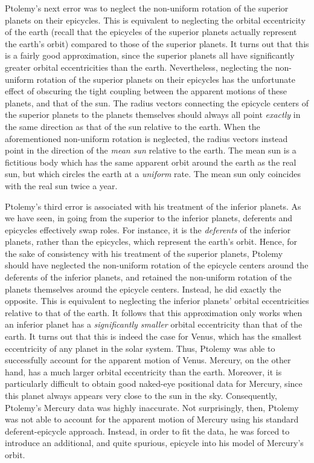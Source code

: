 Ptolemy's next error was to neglect the non-uniform rotation of the
superior planets on their epicycles. This is equivalent to neglecting
the orbital eccentricity of the earth (recall that the epicycles of the superior
planets actually represent the earth's orbit) compared to those of
the superior planets. It turns out that this is a fairly good approximation,
since the superior planets all have significantly greater orbital eccentricities
than the earth. Nevertheless, 
neglecting  the non-uniform rotation of the
superior planets on their epicycles has the unfortunate effect of obscuring the tight coupling between
the apparent motions of these planets, and that of the sun. The radius vectors connecting the epicycle centers of the
superior planets to the planets themselves should always all point {\em exactly}\/ in the
same direction as that of the sun relative to the earth.
When the aforementioned non-uniform rotation is neglected, the radius
vectors instead point in the direction of the {\em mean sun}\/ relative to
the earth. The mean sun is a fictitious body which has the
same apparent orbit around the earth as the real sun, but which circles
the earth at a {\em uniform}\/ rate. The mean sun only coincides with the
real sun twice a year.

Ptolemy's third error is associated with his treatment of the
inferior planets. As we have seen, in going from the superior to the
inferior planets, deferents and epicycles effectively swap roles. 
For instance, it is the {\em deferents}\/ of the inferior planets, rather than the epicycles, which represent
the earth's orbit. Hence, for the sake of consistency with his treatment of
the superior planets, Ptolemy should have neglected the non-uniform
rotation of the epicycle centers around the deferents of the inferior
planets, and retained the non-uniform rotation of the planets themselves around the
epicycle centers. Instead, he did exactly the opposite. This
is equivalent to neglecting the inferior planets' orbital eccentricities relative to
that of the earth. It follows that this approximation only works when an inferior
planet has a {\em significantly smaller}\/ orbital eccentricity than that of the earth.
It turns out that this is indeed the case for Venus, which has the smallest eccentricity
of any planet in the solar system. Thus, Ptolemy was able to
successfully account for the apparent motion of Venus. Mercury, on the
other hand, has a much larger orbital eccentricity than the earth. Moreover, it
is particularly difficult to obtain good naked-eye positional data for Mercury, since this planet always appears 
very close to the sun in the sky. Consequently,
Ptolemy's Mercury data was highly inaccurate.
 Not surprisingly, then, Ptolemy was not able to account for the apparent motion of Mercury
using his standard deferent-epicycle approach. Instead, in order to fit the data, he was forced
to introduce an additional, and quite spurious, epicycle into his  model of
Mercury's orbit.

